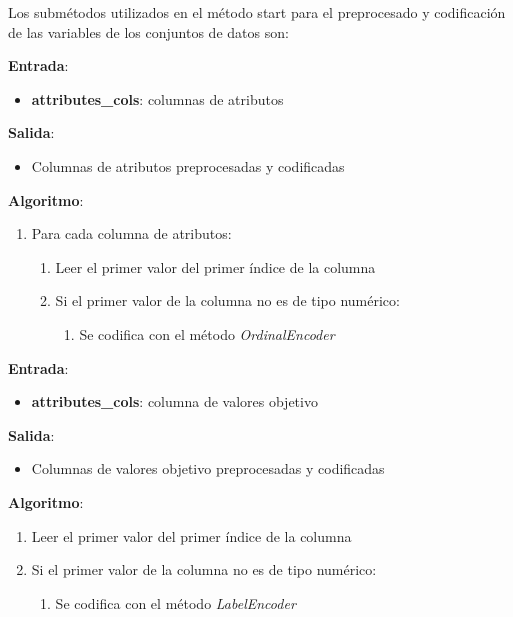 \documentclass[conference,a4paper]{IEEEtran}
\begin{document}
Los submétodos utilizados en el método start para el preprocesado y codificación de las variables de los conjuntos de datos son: \\
\begin{textb}

    \textbf{Entrada}:
    \begin{itemize}
    \item \textbf{attributes\_cols}: columnas de atributos
\end{itemize}
\textbf{Salida}:
\begin{itemize}
    \item Columnas de atributos preprocesadas y codificadas
\end{itemize}
\textbf{Algoritmo}:
\begin{enumerate}
    \item Para cada columna de atributos:
    \begin{enumerate}
      \item Leer el primer valor del primer índice de la columna
      \item Si el primer valor de la columna no es de tipo numérico:
        \begin{enumerate}
          \item Se codifica con el método \textit{OrdinalEncoder}
        \end{enumerate}
    \end{enumerate}
\end{enumerate}
\end{textb}

\begin{textb}

    \textbf{Entrada}:
    \begin{itemize}
    \item \textbf{attributes\_cols}: columna de valores objetivo
\end{itemize}
\textbf{Salida}:
\begin{itemize}
    \item Columnas de valores objetivo preprocesadas y codificadas
\end{itemize}
\textbf{Algoritmo}:
\begin{enumerate}
    \item Leer el primer valor del primer índice de la columna
    \item Si el primer valor de la columna no es de tipo numérico:
      \begin{enumerate}
        \item Se codifica con el método \textit{LabelEncoder}
      \end{enumerate}
\end{enumerate}
\end{textb}
\end{document}
